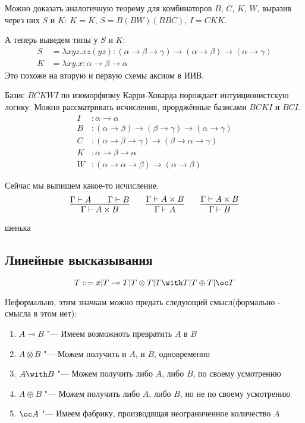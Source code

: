 Можно доказать аналогичную теорему для комбинаторов $B$, $C$, $K$, $W$, выразив через них $S$ и $K$:
$K = K$, $S = B (BW) (BBC)$, $I = CKK$.

А теперь выведем типы у $S$ и $K$:
\begin{align*}
    S &= \lambda x y z . x z (y z) : (\alpha \rightarrow \beta \rightarrow \gamma) \rightarrow
        (\alpha \rightarrow \beta) \rightarrow (\alpha \rightarrow \gamma) \\
    K &= \lambda x y . x : \alpha \rightarrow \beta \rightarrow \alpha
\end{align*}
Это похоже на вторую и первую схемы аксиом в ИИВ.

Базис $BCKWI$ по изоморфизму Карри-Ховарда порождает интуиционистскую логику.
Можно рассматривать исчисления, прорджённые базисами $BCKI$ и $BCI$.
\begin{align*}
    I &: \alpha \rightarrow \alpha \\
    B &: (\alpha \rightarrow \beta) \rightarrow (\beta \rightarrow \gamma) \rightarrow (\alpha \rightarrow \gamma) \\
    C &: (\alpha \rightarrow \beta \rightarrow \gamma) \rightarrow (\beta \rightarrow \alpha \rightarrow \gamma) \\
    K &: \alpha \rightarrow \beta \rightarrow \alpha \\
    W &: (\alpha \rightarrow \alpha \rightarrow \beta) \rightarrow (\alpha \rightarrow \beta)
\end{align*}

Сейчас мы выпишем какое-то исчисление.
\[
    \infer{\Gamma \vdash A \times B}{\Gamma \vdash A && \Gamma \vdash B} \qquad
    \infer{\Gamma \vdash A}{\Gamma \vdash A \times B} \qquad
    \infer{\Gamma \vdash B}{\Gamma \vdash A \times B}
\]

\todo{}шенька

\subsection{\texorpdfstring{Линейные высказывания}{Linear statements}}
\begin{definition}
    \begin{bnf}
    \[
        T ::= x | T \multimap T | T \otimes T | T \with T | T \oplus T | \oc T
    \]
    \end{bnf}
\end{definition}
Неформально, этим значкам можно предать следующий смысл(формально - смысла в этом нет):
\begin{enumerate}
	\item $A \multimap B$  "--- Имеем возможноть превратить $A$ в $B$
	\item $A \otimes B$ "--- Можем получить и $A$, и $B$, одновременно
	\item $A \with B$ "--- Можем получить либо $A$, либо $B$, по своему усмотрению
	\item $A \oplus B$ "--- Можем получить либо $A$, либо $B$, но не по своему усмотрению
	\item $\oc A$ "--- Имеем фабрику, производящая  неограниченное количество $A$
\end{enumerate}

